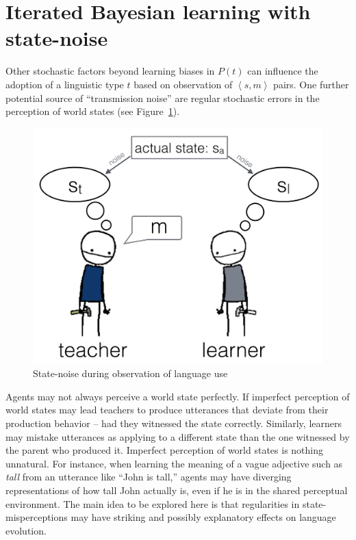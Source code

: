 \documentclass[10pt,a4paper]{article}
\newcommand{\tuple}[1]{\ensuremath{\left\langle #1 \right\rangle}}
\begin{document}
\section{Iterated Bayesian learning with state-noise}

Other stochastic factors beyond learning biases in $P(t)$ can influence the adoption of a
linguistic type $t$ based on observation of $\tuple{s,m}$ pairs. One further potential source
of ``transmission noise'' are regular stochastic errors in the perception of world states (see
Figure~\ref{fig:cartoon}).
%
\begin{figure}[t]
  \centering
  \includegraphics[width = 0.75\linewidth]{pics/cartoon_picture.png}
  \caption{State-noise during observation of language use}
  \label{fig:cartoon}
\end{figure}
% 
Agents may not always perceive a world state perfectly. If imperfect perception of world states
may lead teachers to produce utterances that deviate from their production behavior -- had they
witnessed the state correctly. Similarly, learners may mistake utterances as applying to a
different state than the one witnessed by the parent who produced it. Imperfect perception of
world states is nothing unnatural. For instance, when learning the meaning of a vague adjective
such as {\em tall} from an utterance like ``John is tall,'' agents may have diverging
representations of how tall John actually is, even if he is in the shared perceptual
environment. The main idea to be explored here is that regularities in state-misperceptions may
have striking and possibly explanatory effects on language evolution. 
\end{document}
